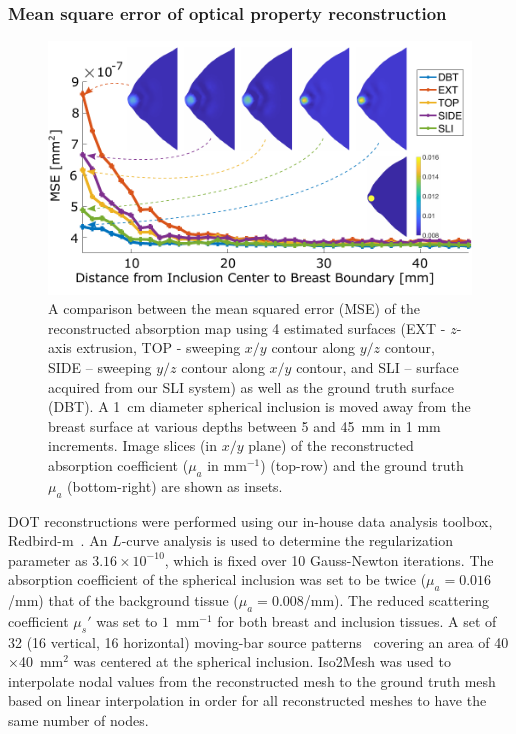 \subsubsection{Mean square error of optical property reconstruction}
\begin{figure}
	\begin{center}
	    \includegraphics[width=.9\textwidth]{fig/omci/mse.pdf}
	\end{center}
	\caption{A comparison between the mean squared error (\ac{MSE}) of the reconstructed absorption map using 4 estimated surfaces (EXT - $z$-axis extrusion, TOP - sweeping $x/y$ contour along $y/z$ contour, SIDE -- sweeping $y/z$ contour along $x/y$ contour, and \ac{SLI} -- surface acquired from our \ac{SLI} system) as well as the ground truth surface (\ac{DBT}). A 1~cm diameter spherical inclusion is moved away from the breast surface at various depths between 5 and 45~mm in 1 mm increments. Image slices (in $x/y$ plane) of the reconstructed absorption coefficient ($\mu_a$ in mm$^{-1}$) (top-row) and the ground truth $\mu_a$ (bottom-right) are shown as insets.}
	\label{fig:mse}
\end{figure} 

\ac{DOT} reconstructions were performed using our in-house data analysis toolbox, Redbird-m~\cite{Redbird2008}. An $L$-curve analysis is used to determine the regularization parameter as $3.16\times 10^{-10}$, which is fixed over 10 Gauss-Newton iterations. The absorption coefficient of the spherical inclusion was set to be twice ($\mu_a=0.016$/mm) that of the background tissue ($\mu_a=0.008$/mm). The reduced scattering coefficient $\mu_s'$ was set to $1$~mm$^{-1}$ for both breast and inclusion tissues. A set of 32 (16 vertical, 16 horizontal) moving-bar source patterns~\cite{Yao2015} covering an area of 40$\times$40~mm$^2$ was centered at the spherical inclusion. Iso2Mesh was used to interpolate nodal values from the reconstructed mesh to the ground truth mesh based on linear interpolation in order for all reconstructed meshes to have the same number of nodes.

